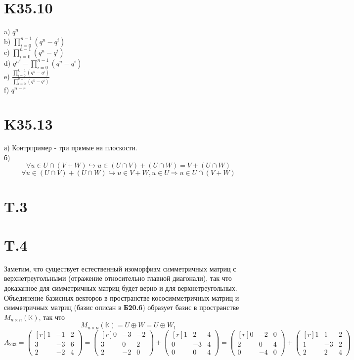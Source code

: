 \documentclass[a4paper,12pt]{article} %
\begin{document}
\section*{K35.10}
a) $q^{n}$\\
b) $\prod_{i=0}^{n-1}\left(q^{n}-q^{i}\right)$\\
c) $\prod_{i=0}^{n-1}\left(q^{n}-q^{i}\right)$\\
d) $q^{n^2}-\prod_{i=0}^{n-1}\left(q^{n}-q^{i}\right)$\\
e) $\frac{\prod_{i=0}^{k-1}\left(q^{n}-q^{i}\right)}{\prod_{i=0}^{k-1}\left(q^{k}-q^{i}\right)}$\\
f) $q^{n-r}$
\section*{K35.13}
а) Контрпример - три прямые на плоскости.\\
б) $$\forall u\in U\cap(V+W)\hookrightarrow u\in (U\cap V)+(U\cap W)=V+(U\cap W)$$
$$\forall u\in (U\cap V)+(U\cap W)\hookrightarrow u\in V+W, u\in U\Rightarrow u\in U\cap(V+W)$$
\section*{T.3}

\section*{T.4}
Заметим, что существует естественный изоморфизм симметричных матриц с верхнетреугольными (отражение относительно главной диагонали), так что доказанное для симметричных матриц будет верно и для верхнетреугольных.\\
Объединение базисных векторов в пространстве кососимметричных матриц и симметричных матриц (базис описан в \textbf{Б20.6}) образует базис в пространстве $M_{n\times n}(\mathbb{K})$, так что $$M_{n\times n}(\mathbb{K})=U\oplus W=U\oplus W_1$$
$$A_{233}=\begin{pmatrix*}[r]
    1&-1&2\\
    3&-3&6\\
    2&-2&4
\end{pmatrix*}=\begin{pmatrix*}[r]
    0&-3&-2\\
    3&0&2\\
    2&-2&0
\end{pmatrix*}+\begin{pmatrix*}[r]
    1&2&4\\
    0&-3&4\\
    0&0&4
\end{pmatrix*}=\begin{pmatrix*}[r]
    0&-2&0\\
    2&0&4\\
    0&-4&0
\end{pmatrix*}+\begin{pmatrix*}[r]
    1&1&2\\
    1&-3&2\\
    2&2&4
\end{pmatrix*}$$
\end{document}
